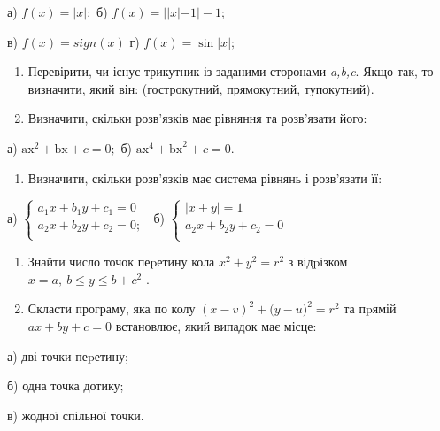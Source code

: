 \documentclass[]{article}
\begin{document}
а) \(f(x) = |x|;\) б) \(f(x) = ||x| - 1| - 1;\)

в) \(f(x) = sign(x)\) г) \(f(x) = \mathrm{\sin}|x|;\)

\begin{enumerate}
\def\labelenumi{\arabic{enumi})}
\setcounter{enumi}{7}
\item
  Перевірити, чи існує трикутник із заданими сторонами \emph{a,b,c}.
  Якщо так, то визначити, який він: (гострокутний, прямокутний,
  тупокутний).
\item
  Визначити, скільки розв'язків має рівняння та розв'язати його:
\end{enumerate}

а) \(\mathrm{\text{ax}}^{2} + \mathrm{\text{bx}} + c = 0;\) б)
\(\mathrm{\text{ax}}^{4} + \mathrm{\text{bx}}^{2} + c = 0\mathrm{.}\)

\begin{enumerate}
\def\labelenumi{\arabic{enumi})}
\setcounter{enumi}{7}
\item
  Визначити, скільки розв'язків має система рівнянь і розв'язати її:
\end{enumerate}

а) \(\left\{ \begin{matrix}
a_{1}x + b_{1}y + c_{1} = 0 \\
a_{2}x + b_{2}y + c_{2} = 0; \\
\end{matrix} \right.\ \) б) \(\left\{ \begin{matrix}
\left| x + y \right| = 1 \\
a_{2}x + b_{2}y + c_{2} = 0 \\
\end{matrix} \right.\ \)

\begin{enumerate}
\def\labelenumi{\arabic{enumi})}
\setcounter{enumi}{7}
\item
  Знайти число точок пеpетину кола \(x^{2} + y^{2} = r^{2}\) з відpізком
  \(x = a,\ b \leq y \leq b + c^{2}\) .
\item
  Скласти програму, яка по колу
  \({(x - v)}^{2} + ({y - u)}^{2} = r^{2}\) та пpямій
  \(ax + by + c = 0\) встановлює, який випадок має місце:
\end{enumerate}

а) дві точки пеpетину;

б) одна точка дотику;

в) жодної спільної точки.
\end{document}
